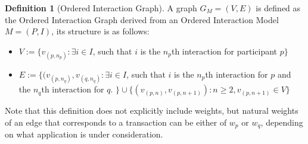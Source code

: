 \documentclass[a4paper,11pt]{book}
\theoremstyle{definition}
\newtheorem{definition}{Definition}
\begin{document}
\begin{definition}[Ordered Interaction Graph]
    A graph $G_M = (V, E)$ is defined as the Ordered Interaction Graph derived from an Ordered Interaction Model $M = (P,I)$,
    its structure is as follows:

    \begin{itemize}
        \item $V := \{ v_{(p, n_p)} : \exists i \in I$, such that $i$ is the $n_p$th interaction for participant $p\}$\\
        \item $E := \{ (v_{(p, n_q)}, v_{(q, n_q)} : \exists i \in I$, such that $i$ is the $n_p$th interaction
        for $p$ and the $n_q$th interaction for $q$. $\} \cup \{ (v_{(p, n)}, v_{(p, n+1)}) : n \geq 2, v_{(p, n+1)} \in V\}$
    \end{itemize}
\end{definition}
    
Note that this definition does not explicitly include weights, but natural weights of an edge that corresponds
to a transaction can be either of $w_p$ or $w_q$, depending on what application is under consideration.
\end{document}
